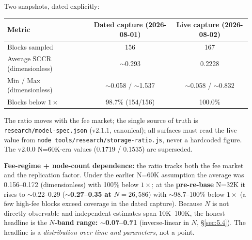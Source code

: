 \documentclass[11pt]{article}
\begin{document}
Two snapshots, dated explicitly:
\begin{center}
\renewcommand{\arraystretch}{1.25}
\begin{tabular}{lcc}
\toprule
Metric & Dated capture (2026-08-01) & Live capture (2026-08-02) \\
\midrule
Blocks sampled & 156 & 167 \\
Average SCCR (dimensionless) & $\sim$0.293 & 0.2228 \\
Min / Max (dimensionless) & $\sim$0.058 / $\sim$1.537 & $\sim$0.058 / $\sim$0.832 \\
Blocks below $1\times$ & 98.7\% (154/156) & 100.0\% \\
\bottomrule
\end{tabular}
\end{center}
The ratio moves with the fee market; the single source of truth is \texttt{research/model-spec.json} (v2.1.1, canonical); all surfaces must read the live value from \texttt{node tools/research/storage-ratio.js}, never a hardcoded figure. The v2.0.0 N=60K-era values (0.1719 / 0.1535) are superseded.

\textbf{Fee-regime + node-count dependence:} the ratio tracks both the fee market and the replication factor. Under the earlier N=60K assumption the average was 0.156--0.172 (dimensionless) with 100\% below $1\times$; at the \textbf{pre-re-base} N=32K it rises to $\sim$0.22--0.29 (\textbf{$\sim$0.27--0.35 at $N=26{,}586$}) with $\sim$98.7--100\% below $1\times$ (a few high-fee blocks exceed coverage in the dated capture). Because $N$ is not directly observable and independent estimates span 10K--100K, the honest headline is the \textbf{$N$-band range: $\sim$0.07--0.71} (inverse-linear in $N$, \S\ref{sec:5.4}). The headline is a \emph{distribution over time and parameters}, not a point.
\end{document}
